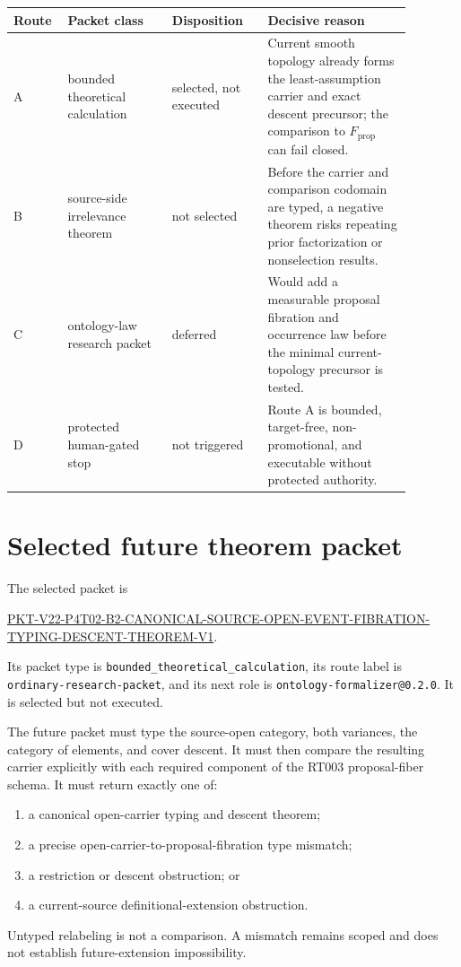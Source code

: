 \documentclass[11pt]{article}
\newcommand{\Fprop}{F_{\mathrm{prop}}}
\begin{document}
\begin{center}
\small
\begin{tabular}{>{\raggedright\arraybackslash}p{0.09\linewidth}
                >{\raggedright\arraybackslash}p{0.24\linewidth}
                >{\raggedright\arraybackslash}p{0.22\linewidth}
                >{\raggedright\arraybackslash}p{0.33\linewidth}}
\toprule
Route & Packet class & Disposition & Decisive reason\\
\midrule
A & bounded theoretical calculation & selected, not executed & Current smooth
topology already forms the least-assumption carrier and exact descent
precursor; the comparison to \(\Fprop\) can fail closed.\\
B & source-side irrelevance theorem & not selected & Before the carrier and
comparison codomain are typed, a negative theorem risks repeating prior
factorization or nonselection results.\\
C & ontology-law research packet & deferred & Would add a measurable proposal
fibration and occurrence law before the minimal current-topology precursor is
tested.\\
D & protected human-gated stop & not triggered & Route A is bounded,
target-free, non-promotional, and executable without protected authority.\\
\bottomrule
\end{tabular}
\end{center}

\section{Selected future theorem packet}

The selected packet is
\begin{center}
\small
\url{PKT-V22-P4T02-B2-CANONICAL-SOURCE-OPEN-EVENT-FIBRATION-TYPING-DESCENT-THEOREM-V1}.
\end{center}
Its packet type is \texttt{bounded\_theoretical\_calculation}, its route label
is \texttt{ordinary-research-packet}, and its next role is
\texttt{ontology-formalizer@0.2.0}. It is selected but not executed.

The future packet must type the source-open category, both variances, the
category of elements, and cover descent. It must then compare the resulting
carrier explicitly with each required component of the RT003 proposal-fiber
schema. It must return exactly one of:
\begin{enumerate}
  \item a canonical open-carrier typing and descent theorem;
  \item a precise open-carrier-to-proposal-fibration type mismatch;
  \item a restriction or descent obstruction; or
  \item a current-source definitional-extension obstruction.
\end{enumerate}
Untyped relabeling is not a comparison. A mismatch remains scoped and does not
establish future-extension impossibility.
\end{document}
